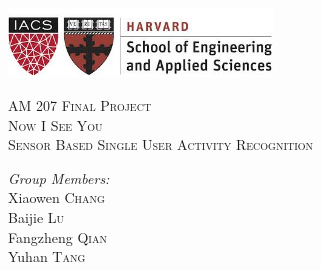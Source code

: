 \documentclass[10pt,letter]{article}
\numberwithin{equation}{section} %
\numberwithin{figure}{section} %
\numberwithin{table}{section} %
\begin{document}
\begin{titlepage}

\newcommand{\HRule}{\rule{\linewidth}{0.5mm}} %

\includegraphics[width=7cm]{logo.png}\\[2cm] 
\center %

\textsc{\Huge AM 207 Final Project}\\[1.5cm] %
\textsc{\LARGE Now I See You}\\[0.5cm] %
\textsc{\Large Sensor Based Single User Activity Recognition}\\[3cm] %
 

\begin{minipage}{0.4\textwidth}
\center \large
\emph{Group Members:}\\[0.4cm]
Xiaowen \textsc{Chang} \\
Baijie \textsc{Lu}\\ 
Fangzheng \textsc{Qian} \\
Yuhan \textsc{Tang} 
\end{minipage}
 

\vfill %

\end{titlepage}
\end{document}

